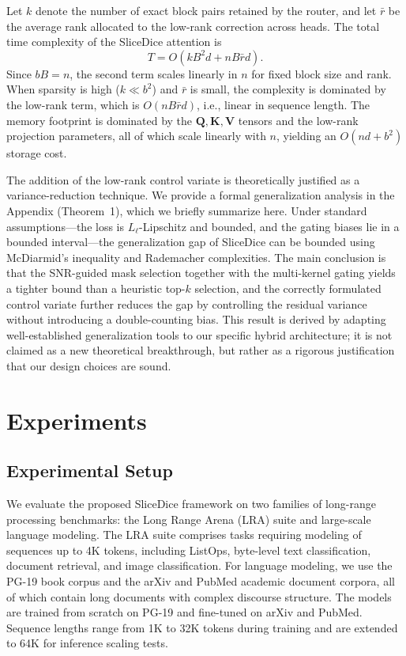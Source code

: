 \documentclass{article}
\begin{document}
Let $k$ denote the number of exact block pairs retained by the router, and let $\bar{r}$ be the average rank allocated to the low-rank correction across heads. The total time complexity of the SliceDice attention is
\begin{equation}
    T = O\!\left(k B^2 d + n B \bar{r} d\right).
\end{equation}
Since $bB=n$, the second term scales linearly in $n$ for fixed block size and rank. When sparsity is high ($k \ll b^2$) and $\bar{r}$ is small, the complexity is dominated by the low-rank term, which is $O(n B \bar{r} d)$, i.e., linear in sequence length. The memory footprint is dominated by the $\mathbf{Q},\mathbf{K},\mathbf{V}$ tensors and the low-rank projection parameters, all of which scale linearly with $n$, yielding an $O(n d + b^2)$ storage cost.

The addition of the low-rank control variate is theoretically justified as a variance-reduction technique. We provide a formal generalization analysis in the Appendix (Theorem~1), which we briefly summarize here. Under standard assumptions—the loss is $L_\ell$-Lipschitz and bounded, and the gating biases lie in a bounded interval—the generalization gap of SliceDice can be bounded using McDiarmid's inequality and Rademacher complexities. The main conclusion is that the SNR-guided mask selection together with the multi-kernel gating yields a tighter bound than a heuristic top-$k$ selection, and the correctly formulated control variate further reduces the gap by controlling the residual variance without introducing a double-counting bias. This result is derived by adapting well-established generalization tools to our specific hybrid architecture; it is not claimed as a new theoretical breakthrough, but rather as a rigorous justification that our design choices are sound.

\section{Experiments}
\label{sec:experiments}

\subsection{Experimental Setup}

We evaluate the proposed SliceDice framework on two families of long-range processing benchmarks: the Long Range Arena (LRA) suite and large-scale language modeling. The LRA suite comprises tasks requiring modeling of sequences up to 4K tokens, including ListOps, byte-level text classification, document retrieval, and image classification. For language modeling, we use the PG-19 book corpus and the arXiv and PubMed academic document corpora, all of which contain long documents with complex discourse structure. The models are trained from scratch on PG-19 and fine-tuned on arXiv and PubMed. Sequence lengths range from 1K to 32K tokens during training and are extended to 64K for inference scaling tests.
\end{document}
